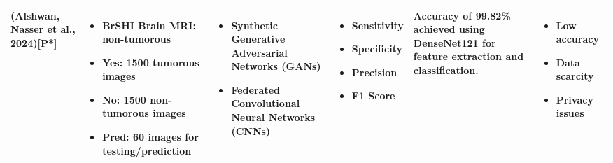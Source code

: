 \documentclass[12pt]{article}
\begin{document}
\begin{longtable}{|>{\RaggedRight}p{2.5cm}|>{\RaggedRight}p{2.8cm}|>{\RaggedRight}p{4cm}|>{\RaggedRight}p{2.8cm}|>{\RaggedRight}p{3.2cm}|>{\RaggedRight}p{3.5cm}|}
(Alshwan, Nasser et al., 2024)[P*] & 
\begin{itemize}[leftmargin=8pt, itemsep=1pt, parsep=0pt]
\item BrSHI Brain MRI: non-tumorous
\item Yes: 1500 tumorous images
\item No: 1500 non-tumorous images
\item Pred: 60 images for testing/prediction
\end{itemize} & 
\begin{itemize}[leftmargin=8pt, itemsep=1pt, parsep=0pt]
\item Synthetic Generative Adversarial Networks (GANs)
\item Federated Convolutional Neural Networks (CNNs)
\end{itemize} & 
\begin{itemize}[leftmargin=8pt, itemsep=1pt, parsep=0pt]
\item Sensitivity
\item Specificity
\item Precision
\item F1 Score
\end{itemize} & 
Accuracy of 99.82\% achieved using DenseNet121 for feature extraction and classification. & 
\begin{itemize}[leftmargin=8pt, itemsep=1pt, parsep=0pt]
\item Low accuracy
\item Data scarcity
\item Privacy issues
\end{itemize} \\
\hline


\end{longtable}
\end{document}
